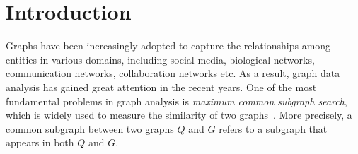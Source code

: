 \section{Introduction}
\label{sec:intro}

Graphs have been increasingly adopted to capture the relationships among entities in various domains, including social media, biological networks, communication networks, collaboration networks  etc. As a result, graph data analysis has gained great attention in the recent years. 
%
One of the most fundamental problems in graph analysis is \emph{maximum common subgraph search}, which is widely used to measure the similarity of two graphs~\cite{mcgregor1982backtrack,mccreesh2016clique,vismara2008finding,zhoustrengthened,liu2020learning,liu2023hybrid,mccreesh2017partitioning,choi2012efficient,rutgers2010approximate,xiao2009generative,zanfir2018deep,bai2021glsearch}. 
%
More precisely, a common subgraph between two graphs $Q$ and $G$ refers to a subgraph  that  appears in both $Q$ and $G$. 

